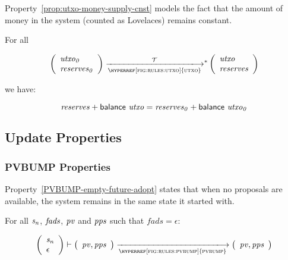 Property~\ref{prop:utxo-money-supply-cnst} models the fact that the amount of
money in the system (counted as Lovelaces) remains constant.

\begin{property}\label{prop:utxo-money-supply-cnst}
  For all

  $$
  \left(
    \begin{array}{l}
      \var{utxo_0}\\
      \var{reserves_0}
    \end{array}
  \right)
  \transtar{\hyperref[fig:rules:utxo]{utxo}}{\txs}
  \left(
    \begin{array}{l}
      \var{utxo}\\
      \var{reserves}
    \end{array}
  \right)
  $$

  we have:

  $$ \mathit{reserves} + \mathsf{balance}~ \mathit{utxo} =  \mathit{reserves_0} + \mathsf{balance}~ \mathit{utxo_0} $$
\end{property}

\subsection{Update Properties}
\label{sec:update-properties}

\subsubsection{PVBUMP Properties}
\label{sec:pvbump-properties}

Property~\ref{PVBUMP-empty-future-adopt} states that when no proposals are
available, the system remains in the same state it started with.

\begin{property}\label{PVBUMP-empty-future-adopt}
  \textrm{For all $\mathit{s_n}$, $\mathit{fads}$, $\mathit{pv}$ and $\mathit{pps}$ such
    that $fads = \epsilon$:}

  $$
  \left(
    \begin{array}{l}
      \var{s_n}\\
      \epsilon
    \end{array}
  \right)
  \vdash
  \left(
    \begin{array}{l}
      \var{pv}, \var{pps}\\
    \end{array}
  \right)
  \trans{\hyperref[fig:rules:pvbump]{pvbump}}{}
  \left(
    \begin{array}{l}
      \var{pv}, \var{pps}\\
    \end{array}
  \right)
  $$
\end{property}

